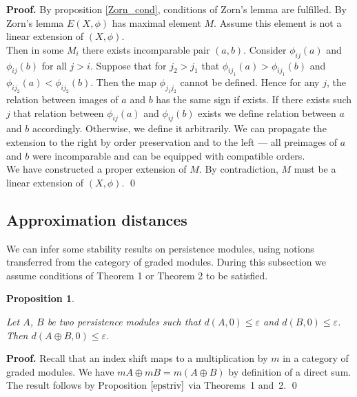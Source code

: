 \documentclass[english,12pt]{article}
\newcounter{stmcounter}[section]
\numberwithin{equation}{section}
\newtheorem{proposition}[stmcounter]{Proposition}
\theoremstyle{definition}
\theoremstyle{remark}
\newenvironment{pf}{\noindent\textbf{Proof.}}{\qed}
\renewcommand{\leq}{\leqslant}
\begin{document}
\begin{pf}
  By proposition \ref{Zorn_cond}, conditions of Zorn's lemma are fulfilled. By Zorn's lemma $E(X,\phi)$ has maximal element $M$. Assume this element is not a linear extension of $(X,\phi)$.\\

  Then in some $M_i$ there exists incomparable pair $(a,b)$. Consider $\phi_{ij}(a)$ and $\phi_{ij}(b)$ for all $j > i$. Suppose that for $j_2 > j_1$ that $\phi_{ij_1}(a) > \phi_{ij_1}(b)$ and $\phi_{ij_2}(a) < \phi_{ij_2}(b)$. Then the map $\phi_{j_1j_2}$ cannot be defined. Hence for any $j$, the relation between images of $a$ and $b$ has the same sign if exists. If there exists such $j$ that relation between $\phi_{ij}(a)$ and $\phi_{ij}(b)$ exists we define relation between $a$ and $b$ accordingly. Otherwise, we define it arbitrarily. We can propagate the extension to the right by order preservation and to the left --- all preimages of $a$ and $b$ were incomparable and can be equipped with compatible orders.\\

  We have constructed a proper extension of $M$. By contradiction, $M$ must be a linear extension of $(X,\phi)$.
\end{pf}

\subsection{Approximation distances}

We can infer some stability results on persistence modules, using notions transferred from the category of graded modules. During this subsection we assume conditions of Theorem 1 or Theorem 2 to be satisfied.\\

\begin{proposition} ~ \par
  \label{prop:sum}
  Let $A$, $B$ be two persistence modules such that $d(A,0) \leq \varepsilon$ and $d(B,0) \leq \varepsilon$. Then $d(A \oplus B,0) \leq \varepsilon$.
\end{proposition}

\begin{pf}
  Recall that an index shift maps to a multiplication by $m$ in a category of graded modules. We have $mA \oplus mB = m(A \oplus B)$ by definition of a direct sum. The result follows by Proposition $\ref{epstriv}$ via Theorems~1 and~2.
\end{pf}
\end{document}
